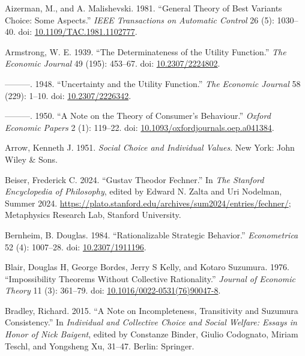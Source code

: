 \documentclass[
  11pt,
  letterpaper,
  DIV=11,
  numbers=noendperiod,
  twoside]{scrartcl}
\newlength{\cslhangindent}
\newenvironment{CSLReferences}[2] %
 {\begin{list}{}{%
  \setlength{\itemindent}{0pt}
  \setlength{\leftmargin}{0pt}
  \setlength{\parsep}{0pt}
  \ifodd #1
   \setlength{\leftmargin}{\cslhangindent}
   \setlength{\itemindent}{-1\cslhangindent}
  \fi
  \setlength{\itemsep}{#2\baselineskip}}}
 {\end{list}}
\begin{document}
\label{refs}
\begin{CSLReferences}{1}{0}
Aizerman, M., and A. Malishevski. 1981. {``General Theory of Best
Variants Choice: Some Aspects.''} \emph{IEEE Transactions on Automatic
Control} 26 (5): 1030--40. doi:
\href{https://doi.org/10.1109/TAC.1981.1102777}{10.1109/TAC.1981.1102777}.

Armstrong, W. E. 1939. {``The Determinateness of the Utility
Function.''} \emph{The Economic Journal} 49 (195): 453--67. doi:
\href{https://doi.org/10.2307/2224802}{10.2307/2224802}.

---------. 1948. {``Uncertainty and the Utility Function.''} \emph{The
Economic Journal} 58 (229): 1--10. doi:
\href{https://doi.org/10.2307/2226342}{10.2307/2226342}.

---------. 1950. {``A Note on the Theory of Consumer's Behaviour.''}
\emph{Oxford Economic Papers} 2 (1): 119--22. doi:
\href{https://doi.org/10.1093/oxfordjournals.oep.a041384}{10.1093/oxfordjournals.oep.a041384}.

Arrow, Kenneth J. 1951. \emph{Social Choice and Individual Values}. New
York: John Wiley \& Sons.

Beiser, Frederick C. 2024. {``{Gustav Theodor Fechner}.''} In \emph{The
{Stanford} Encyclopedia of Philosophy}, edited by Edward N. Zalta and
Uri Nodelman, {S}ummer 2024.
\url{https://plato.stanford.edu/archives/sum2024/entries/fechner/};
Metaphysics Research Lab, Stanford University.

Bernheim, B. Douglas. 1984. {``Rationalizable Strategic Behavior.''}
\emph{Econometrica} 52 (4): 1007--28. doi:
\href{https://doi.org/10.2307/1911196}{10.2307/1911196}.

Blair, Douglas H, George Bordes, Jerry S Kelly, and Kotaro Suzumura.
1976. {``Impossibility Theorems Without Collective Rationality.''}
\emph{Journal of Economic Theory} 11 (3): 361--79. doi:
\href{https://doi.org/10.1016/0022-0531(76)90047-8}{10.1016/0022-0531(76)90047-8}.

Bradley, Richard. 2015. {``A Note on Incompleteness, Transitivity and
Suzumura Consistency.''} In \emph{Individual and Collective Choice and
Social Welfare: Essays in Honor of Nick Baigent}, edited by Constanze
Binder, Giulio Codognato, Miriam Teschl, and Yongsheng Xu, 31--47.
Berlin: Springer.


\end{CSLReferences}
\end{document}
